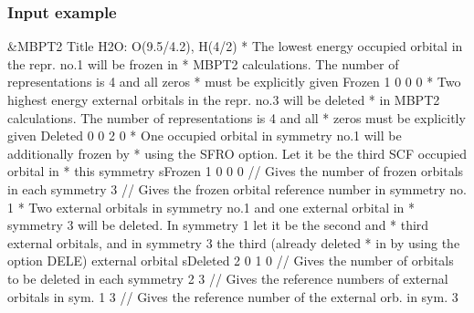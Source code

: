 \subsubsection{Input example}
\begin{inputlisting}
 &MBPT2
Title
 H2O:  O(9.5/4.2), H(4/2)
* The lowest energy occupied orbital in the repr. no.1 will be frozen in
* MBPT2 calculations. The number of representations is 4 and all zeros
* must be explicitly given
Frozen
1 0 0 0
* Two highest energy external orbitals in the repr. no.3 will be deleted
* in MBPT2 calculations. The number of representations is 4 and all
* zeros must be explicitly given
Deleted
0 0 2 0
* One occupied orbital in symmetry no.1 will be additionally frozen by
* using the SFRO option. Let it be the third SCF occupied orbital in
* this symmetry
sFrozen
1 0 0 0   // Gives the number of frozen orbitals in each symmetry
3         // Gives the frozen orbital reference number in symmetry no. 1
* Two external orbitals in symmetry no.1 and one external orbital in
* symmetry 3 will be deleted. In symmetry 1 let it be the second and
* third external orbitals, and in symmetry 3 the third (already deleted
* in by using the option DELE) external orbital
sDeleted
2 0 1 0   // Gives the number of orbitals to be deleted in each symmetry
2 3       // Gives the reference numbers of external orbitals in sym. 1
3         // Gives the reference number of the external orb. in sym. 3
\end{inputlisting}
